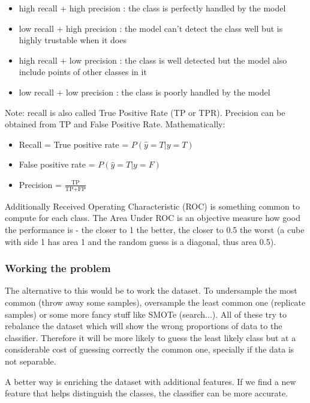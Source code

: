 \begin{itemize}
    \item high recall + high precision : the class is perfectly handled by the model
    \item low recall + high precision : the model can’t detect the class well but is highly trustable when it does
    \item high recall + low precision : the class is well detected but the model also include points of other classes in it
    \item low recall + low precision : the class is poorly handled by the model
\end{itemize}

Note: recall is also called True Positive Rate (TP or TPR). Precision can be obtained from TP and False Positive Rate. Mathematically:
\begin{itemize}
    \item Recall = True positive rate = $P(\hat{y} = T | y = T)$
    \item False positive rate = $P(\hat{y} = T | y = F)$
    \item Precision = $\frac{\text{TP}}{\text{TP}+\text{FP}}$
\end{itemize}

Additionally Received Operating Characteristic (ROC) is something common to compute for each class. The Area Under ROC is an objective measure how good the performance is - the closer to 1 the better, the closer to 0.5 the worst (a cube with side 1 has area 1 and the random guess is a diagonal, thus area 0.5).





\subsubsection{Working the problem}

The alternative to this would be to work the dataset. To undersample the most common (throw away some samples), oversample the least common one (replicate samples) or some more fancy stuff like SMOTe (search...). All of these try to rebalance the dataset which will show the wrong proportions of data to the classifier. Therefore it will be more likely to guess the least likely class but at a considerable cost of guessing correctly the common one, specially if the data is not separable.

A better way is enriching the dataset with additional features. If we find a new feature that helps distinguish the classes, the classifier can be more accurate.







